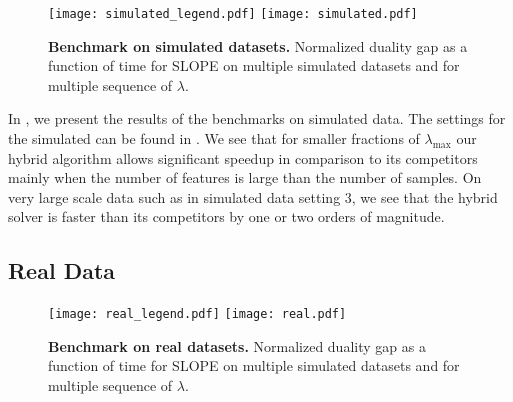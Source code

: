 \begin{figure*}[htb]
  \centering
  \texttt{[image: simulated\_legend.pdf]}
  \texttt{[image: simulated.pdf]}
  \caption{\textbf{Benchmark on simulated datasets.} Normalized duality gap as a function of time for SLOPE on multiple simulated datasets and for multiple sequence of $\lambda$.}
  \label{fig:simulated}
\end{figure*}

In , we present the results of the benchmarks on simulated data.
The settings for the simulated can be found in .
We see that for smaller fractions of $\lambda_{\text{max}}$ our hybrid algorithm allows significant speedup in comparison to its competitors mainly when the number of features is large than the number of samples.
On very large scale data such as in simulated data setting $3$, we see that the hybrid solver is faster than its competitors by one or two orders of magnitude.


\subsection{Real Data}
\begin{figure*}[htb]
  \centering
  \texttt{[image: real\_legend.pdf]}
  \texttt{[image: real.pdf]}
  \caption{\textbf{Benchmark on real datasets.} Normalized duality gap as a function of time for SLOPE on multiple simulated datasets and for multiple sequence of $\lambda$.}
  \label{fig:real}
\end{figure*}
